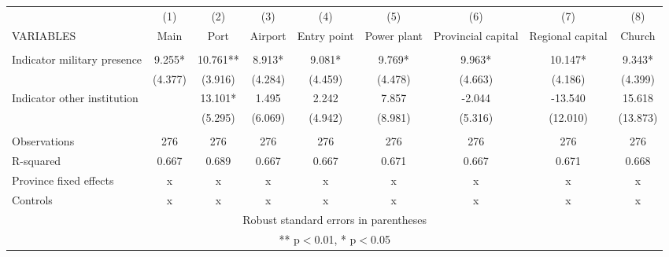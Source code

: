 \begin{tabular}{lcccccccc} \hline
 & (1) & (2) & (3) & (4) & (5) & (6) & (7) & (8) \\
VARIABLES & Main & Port & Airport & Entry point & Power plant & Provincial capital & Regional capital & Church \\ \hline
 &  &  &  &  &  &  &  &  \\
Indicator military presence & 9.255* & 10.761** & 8.913* & 9.081* & 9.769* & 9.963* & 10.147* & 9.343* \\
 & (4.377) & (3.916) & (4.284) & (4.459) & (4.478) & (4.663) & (4.186) & (4.399) \\
Indicator other institution &  & 13.101* & 1.495 & 2.242 & 7.857 & -2.044 & -13.540 & 15.618 \\
 &  & (5.295) & (6.069) & (4.942) & (8.981) & (5.316) & (12.010) & (13.873) \\
 &  &  &  &  &  &  &  &  \\
Observations & 276 & 276 & 276 & 276 & 276 & 276 & 276 & 276 \\
R-squared & 0.667 & 0.689 & 0.667 & 0.667 & 0.671 & 0.667 & 0.671 & 0.668 \\
Province fixed effects & x & x & x & x & x & x & x & x \\
 Controls & x & x & x & x & x & x & x & x \\ \hline
\multicolumn{9}{c}{ Robust standard errors in parentheses} \\
\multicolumn{9}{c}{ ** p$<$0.01, * p$<$0.05} \\
\end{tabular}
